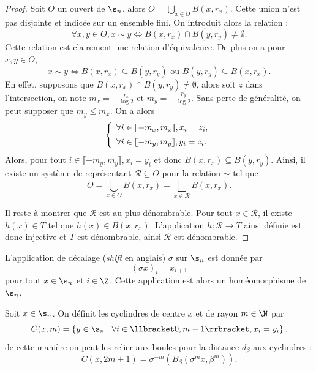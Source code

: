   \begin{proof}
    \leanok
    Soit $O$ un ouvert de $\s_n$, alors $O = \bigcup_{x \in O}{B(x, r_x)}$.
    Cette union n'est pas disjointe et indicée sur un ensemble fini. On introduit alors la relation :
    $$\forall x,y \in O, x\sim y \iff B(x, r_x) \cap B(y, r_y) \not= \emptyset.$$
    Cette relation est clairement une relation d'équivalence. De plus on a pour $x, y \in O$,
    $$x \sim y \iff B(x, r_x) \subseteq B(y, r_y) \text{ ou } B(y, r_y) \subseteq B(x, r_x).$$
    En effet, supposons que $B(x, r_x) \cap B(y, r_y) \not= \emptyset$, alors soit $z$ dans l'intersection, on note $m_x = -\frac{r_x}{\log 2}$
    et $m_y = -\frac{r_y}{\log 2}$.
    Sans perte de généralité, on peut supposer que $m_y \leq m_x$. On a alors
    $$\left\{\begin{array}{l}
	\forall i \in \llbracket -m_x, m_x \rrbracket, x_i = z_i, \vspace{0.5em}\\
      \forall i \in \llbracket -m_y, m_y \rrbracket, y_i = z_i.
    \end{array}\right.$$
    Alors, pour tout $i \in \llbracket -m_y, m_y \rrbracket, x_i = y_i$ et donc $B(x, r_x) \subseteq B(y, r_y)$.
    Ainsi, il existe un système de représentant $\mathcal R \subseteq O$ pour la relation $\sim$ tel que
    $$O = \bigcup_{x\in O}{B(x, r_x)} = \bigsqcup_{x\in\mathcal R}{B(x, r_x)}.$$

    Il reste à montrer que $\mathcal R$ est au plus dénombrable.
    Pour tout $x \in \mathcal R$, il existe $h(x) \in T$ tel que $h(x) \in B(x, r_x)$.
    L'application $h \colon \mathcal R \longrightarrow T$ ainsi définie est donc injective et $T$ est dénombrable,
    ainsi $\mathcal R$ est dénombrable.
  \end{proof}

  \begin{definition}
    \label{def:shift}
    \leanok
    L'application de décalage (\textit{shift} en anglais) $\sigma$ sur $\s_n$ est donnée par
    $$(\sigma x)_i = x_{i+1}$$
    pour tout $x \in \s_n$ et $i \in \Z$.
    Cette application est alors un homéomorphisme de $\s_n$.
  \end{definition}

  \begin{definition}
    \label{def:cylindres}
    \leanok
    Soit $x\in \s_n$. On définit les cyclindres de centre $x$ et de rayon $m \in \N$ par
    $$C(x, m) = \left\{y \in \s_n \mid \forall i \in \llbracket 0, m - 1 \rrbracket, x_i = y_i\right\}.$$
    de cette manière on peut les relier aux boules pour la distance $d_{\beta}$ aux cyclindres :
    $$C(x,2m+1) = \sigma^{-m}(B_{\beta}(\sigma^mx, \beta^m)).$$
  \end{definition}


